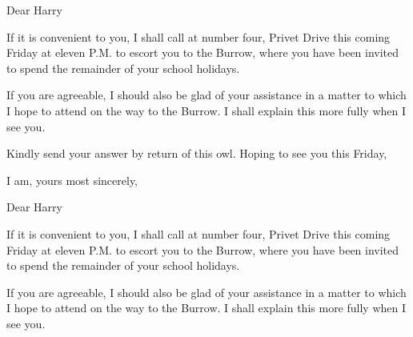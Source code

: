 \documentclass[11pt]{IFSCommunication}
\begin{document}




Dear Harry

If it is convenient to you, I shall call at number four, Privet Drive this coming Friday at eleven P.M. to escort you to the Burrow, where you have been invited to spend the remainder of your school holidays.

If you are agreeable, I should also be glad of your assistance in a matter to which I hope to attend on the way to the Burrow. I shall explain this more fully when I see you.

Kindly send your answer by return of this owl. Hoping to see you this Friday,

\closing{I am, yours most sincerely,}

\clearpage


\senderTitle{}
\senderSuppName{}  %





Dear Harry

If it is convenient to you, I shall call at number four, Privet Drive this coming Friday at eleven P.M. to escort you to the Burrow, where you have been invited to spend the remainder of your school holidays.

If you are agreeable, I should also be glad of your assistance in a matter to which I hope to attend on the way to the Burrow. I shall explain this more fully when I see you.
\end{document}
